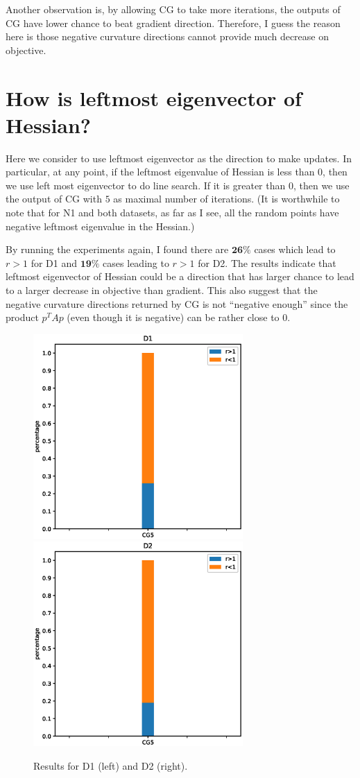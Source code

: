 \documentclass[12pt]{article}
\begin{document}
Another observation is, by allowing CG to take more iterations, the outputs of CG have lower chance to beat gradient direction. Therefore, I guess the reason here is those negative curvature directions cannot provide much decrease on objective.


\section{How is leftmost eigenvector of Hessian?}

Here we consider to use leftmost eigenvector as the direction to make updates. In particular, at any point, if the leftmost eigenvalue of Hessian is less than $0$, then we use left most eigenvector to do line search. If it is greater than $0$, then we use the output of CG with $5$ as maximal number of iterations. (It is worthwhile to note that for N1 and both datasets, as far as I see, all the random points have negative leftmost eigenvalue in the Hessian.)

By running the experiments again, I found there are $\mathbf{26\%}$ cases which lead to $r>1$ for D1 and $\mathbf{19\%}$ cases leading to $r>1$ for D2. The results indicate that leftmost eigenvector of Hessian could be a direction that has larger chance to lead to a larger decrease in objective than gradient. This also suggest that the negative curvature directions returned by CG is not ``negative enough'' since the product $p^TA p$ (even though it is negative) can be rather close to $0$.

\begin{figure}[h]
\includegraphics[width=8cm]{ncd1.eps}
\includegraphics[width=8cm]{ncd2.eps}
\caption{Results for D1 (left) and D2 (right).}
\label{fig:CGvsGD}
\end{figure}
\end{document}
